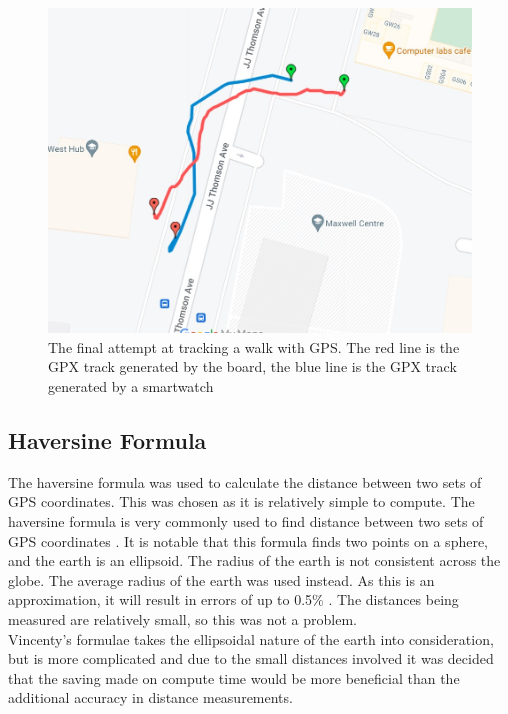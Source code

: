 \documentclass[12pt,a4paper]{report}
\begin{document}
\begin{figure} [h]
\begin{center}
\includegraphics[scale=0.4]{gps2.jpg}
\end{center}
\caption{The final attempt at tracking a walk with GPS. The red line is the GPX track generated by the board, the blue line is the GPX track generated by a smartwatch \cite{googlemapsgeneral}}
\end{figure}
\FloatBarrier

\subsection{Haversine Formula}
The haversine formula was used to calculate the distance between two sets of GPS coordinates. This was chosen as it is relatively simple to compute. The haversine formula is very commonly used to find distance between two sets of GPS coordinates \cite{haversine}. It is notable that this formula finds two points on a sphere, and the earth is an ellipsoid. The radius of the earth is not consistent across the globe. The average radius of the earth was used instead. As this is an approximation, it will result in errors of up to 0.5\% \cite{haversine}. The distances being measured are relatively small, so this was not a problem. \\
Vincenty's formulae takes the ellipsoidal nature of the earth into consideration, but is more complicated and due to the small distances involved it was decided that the saving made on compute time would be more beneficial than the additional accuracy in distance measurements. \\
\end{document}
